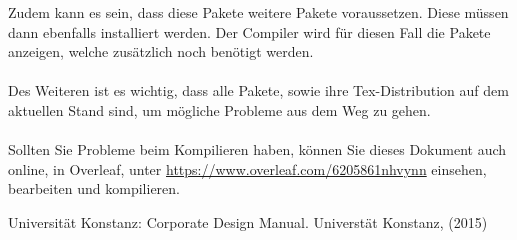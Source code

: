 Zudem kann es sein, dass diese Pakete weitere Pakete voraussetzen. Diese müssen dann ebenfalls installiert werden. Der Compiler wird für diesen Fall die Pakete
anzeigen, welche zusätzlich noch benötigt werden.\\
\\
Des Weiteren ist es wichtig, dass alle Pakete, sowie ihre Tex-Distribution auf dem aktuellen Stand sind, um mögliche Probleme aus dem Weg zu gehen.\\
\\
Sollten Sie Probleme beim Kompilieren haben, können Sie dieses Dokument auch online, in Overleaf, unter \url{https://www.overleaf.com/6205861nhvynn} einsehen, bearbeiten und kompilieren.




%
%
%


\begin{thebibliography}{[MB91a]}

\normalsize
\sffamily

\setlength{\itemsep}{6pt}

Universität Konstanz: Corporate Design Manual.
Universtät Konstanz, (2015)

\end{thebibliography}
